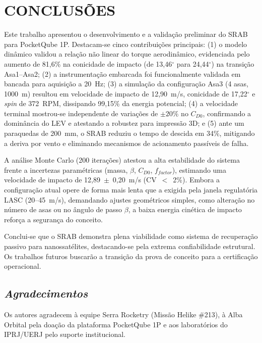 \section{CONCLUSÕES}

Este trabalho apresentou o desenvolvimento e a validação preliminar do SRAB para PocketQube 1P. Destacam-se cinco contribuições principais: (1) o modelo dinâmico validou a relação não linear do torque aerodinâmico, evidenciada pelo aumento de 81,6\% na conicidade de impacto (de 13,46$^\circ$ para 24,44$^\circ$) na transição Asa1--Asa2; (2) a instrumentação embarcada foi funcionalmente validada em bancada para aquisição a 20~Hz; (3) a simulação da configuração Asa3 (4 asas, 1000~m) resultou em velocidade de impacto de 12,90~m/s, conicidade de 17,22$^\circ$ e \textit{spin} de 372~RPM, dissipando 99,15\% da energia potencial; (4) a velocidade terminal mostrou-se independente de variações de $\pm20\%$ no $C_{D0}$, confirmando a dominância do LEV e atestando a robustez para impressão 3D; e (5) ante um paraquedas de 200~mm, o SRAB reduziu o tempo de descida em 34\%, mitigando a deriva por vento e eliminando mecanismos de acionamento passíveis de falha.

A análise Monte Carlo (200 iterações) atestou a alta estabilidade do sistema frente a incertezas paramétricas (massa, $\beta$, $C_{D0}$, $f_{factor}$), estimando uma velocidade de impacto de 12,89~$\pm$~0,20~m/s (CV~$<$~2\%). Embora a configuração atual opere de forma mais lenta que a exigida pela janela regulatória LASC (20--45~m/s), demandando ajustes geométricos simples, como alteração no número de asas ou no ângulo de passo $\beta$, a baixa energia cinética de impacto reforça a segurança do conceito.

Conclui-se que o SRAB demonstra plena viabilidade como sistema de recuperação passivo para nanossatélites, destacando-se pela extrema confiabilidade estrutural. Os trabalhos futuros buscarão a transição da prova de conceito para a certificação operacional.

\subsection*{\textit{Agradecimentos}}

Os autores agradecem à equipe Serra Rocketry (Missão Helike \#213), à Alba Orbital pela doação da plataforma PocketQube 1P e aos laboratórios do IPRJ/UERJ pelo suporte institucional.